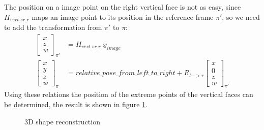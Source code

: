 \documentclass[11pt, oneside]{article}   	%
\begin{document}
The position on a image point on the right vertical face is not as easy, since $H_{vert\_sr\_r}$ maps an image point to its position in the reference frame $\pi'$, so we need to add the transformation from $\pi'$ to $\pi$:
\begin{subequations}
\begin{align*}
\begin{bmatrix}
x \\
z \\
w
\end{bmatrix}_{\pi'} & = H_{vert\_sr\_r} \; \underline{x}_{image} \\
\begin{bmatrix}
x \\
y \\
z \\
w
\end{bmatrix}_{\pi} & = relative\_pose\_from\_left\_to\_right + R_{l->r} \begin{bmatrix}
x \\
0 \\
z \\
w
\end{bmatrix}_{\pi'}
\end{align*}
\end{subequations}
Using these relations the position of the extreme points of the vertical faces can be determined, the result is shown in figure \ref{3d_sr}.

\begin{figure}
 \centering
    \qquad
    \caption{3D shape reconstruction}%
    \label{3d_sr}%
\end{figure}
\end{document}
